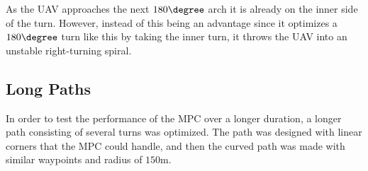 As the UAV approaches the next $180\degree$ arch it is already on the inner side of the turn. However, instead of this being an advantage since it optimizes a $180\degree$ turn like this by taking the inner turn, it throws the UAV into an unstable right-turning spiral.


\subsection{Long Paths}

In order to test the performance of the MPC over a longer duration, a longer path consisting of several turns was optimized. The path was designed with linear corners that the MPC could handle, and then the curved path was made with similar waypoints and radius of $150$m.


